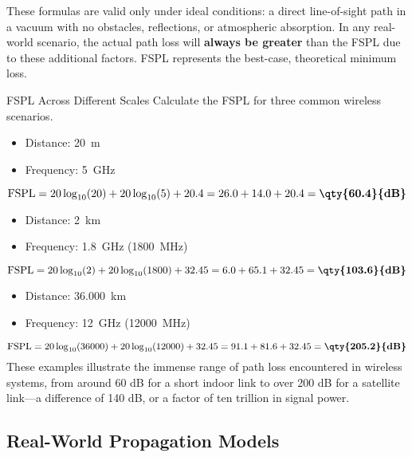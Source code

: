 \begin{warningbox}
    These formulas are valid only under ideal conditions: a direct line-of-sight path in a vacuum with no obstacles, reflections, or atmospheric absorption. In any real-world scenario, the actual path loss will \textbf{always be greater} than the FSPL due to these additional factors. FSPL represents the best-case, theoretical minimum loss.
\end{warningbox}


\begin{workedexample}{FSPL Across Different Scales}
     Calculate the FSPL for three common wireless scenarios.
    
    \begin{itemize}
        \item Distance: \qty{20}{m}
        \item Frequency: \qty{5}{GHz}
    \end{itemize}
    \[ \text{FSPL} = 20\log_{10}(20) + 20\log_{10}(5) + 20.4 = 26.0 + 14.0 + 20.4 = \textbf{\qty{60.4}{dB}} \]

    \begin{itemize}
        \item Distance: \qty{2}{km}
        \item Frequency: \qty{1.8}{GHz} (\qty{1800}{MHz})
    \end{itemize}
    \[ \text{FSPL} = 20\log_{10}(2) + 20\log_{10}(1800) + 32.45 = 6.0 + 65.1 + 32.45 = \textbf{\qty{103.6}{dB}} \]
    
    \begin{itemize}
        \item Distance: \qty{36,000}{km}
        \item Frequency: \qty{12}{GHz} (\qty{12000}{MHz})
    \end{itemize}
    \[ \text{FSPL} = 20\log_{10}(36000) + 20\log_{10}(12000) + 32.45 = 91.1 + 81.6 + 32.45 = \textbf{\qty{205.2}{dB}} \]
     These examples illustrate the immense range of path loss encountered in wireless systems, from around 60 dB for a short indoor link to over 200 dB for a satellite link—a difference of 140 dB, or a factor of ten trillion in signal power.
\end{workedexample}


\subsection{Real-World Propagation Models}

